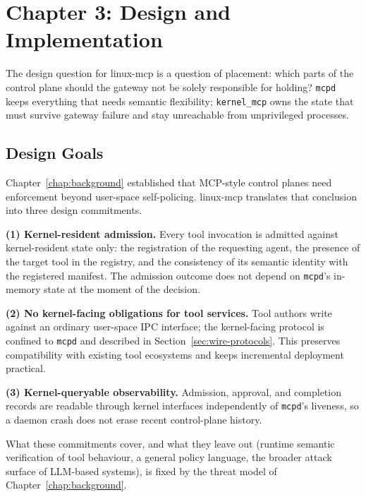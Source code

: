 \section*{Chapter 3: Design and Implementation}
 \label{chap:design} \setcounter{section}{3} \setcounter{subsection}{0}

The design question for linux-mcp is a question of placement: which parts of the control plane should the gateway not be solely responsible for holding?
\texttt{mcpd} keeps everything that needs semantic flexibility; \texttt{kernel\_\allowbreak mcp} owns the state that must survive gateway failure and stay unreachable from unprivileged processes.



\subsection{Design Goals}
\label{sec:design-goals}

Chapter~\ref{chap:background} established that MCP-style control planes need enforcement beyond user-space self-policing. 
linux-mcp translates that conclusion into three design commitments.

\textbf{(1) Kernel-resident admission.}
Every tool invocation is admitted against kernel-resident state only: the registration of the requesting agent, the presence of the target tool in the registry, and the consistency of its semantic identity with the registered manifest.
The admission outcome does not depend on \texttt{mcpd}'s in-memory state at the moment of the decision.

\textbf{(2) No kernel-facing obligations for tool services.}
Tool authors write against an ordinary user-space IPC interface; the kernel-facing protocol is confined to \texttt{mcpd} and described in Section~\ref{sec:wire-protocols}.
This preserves compatibility with existing tool ecosystems and keeps incremental deployment practical.

\textbf{(3) Kernel-queryable observability.}
Admission, approval, and completion records are readable through kernel interfaces independently of \texttt{mcpd}'s liveness, so a daemon crash does not erase recent control-plane history.

What these commitments cover, and what they leave out (runtime semantic verification of tool behaviour, a general policy language, the broader attack surface of LLM-based systems), is fixed by the threat model of Chapter~\ref{chap:background}.



